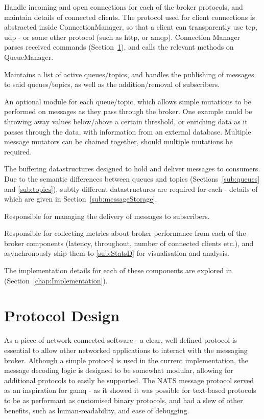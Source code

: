 \begin{description}[style=nextline]
  \item[Connection Manager]
  Handle incoming and open connections for each of the broker protocols, and
  maintain details of connected clients. The protocol used for client
  connections is abstracted inside ConnectionManager, so that a client can
  transparently use \gls{tcp}, \gls{udp} - or some other protocol (such as
  \gls{http}, or \gls{amqp}). Connection Manager parses received commands
  (Section~\ref{sec:protocol}), and calls the relevant methods on QueueManager.
  \item[Queue Manager]
  Maintains a list of active queues/topics, and handles the publishing of
  messages to said queues/topics, as well as the addition/removal of
  subscribers.
  \item[Message Mutators]
  An optional module for each queue/topic, which allows simple mutations to be
  performed on messages as they pass through the broker. One example could be
  throwing away values below/above a certain threshold, or enriching data as it
  passes through the data, with information from an external database. Multiple
  message mutators can be chained together, should multiple mutations be
  required.
  \item[Queue/Topics]
  The buffering datastructures designed to hold and deliver messages to
  consumers. Due to the semantic differences between queues and topics
  (Sections~\ref{sub:queues} and \ref{sub:topics}), subtly different
  datastructures are required for each - details of which are given in
  Section~\ref{sub:messageStorage}.
  \item[Message Shippers]
  Responsible for managing the delivery of messages to subscribers.
  \item[Metric Manager]
  Responsible for collecting metrics about broker performance from each of the
  broker components (latency, throughout, number of connected clients etc.), and
  asynchronously ship them to \ref{sub:StatsD} for visualisation and analysis.
\end{description}

The implementation details for each of these components are explored in
(Section~\ref{chap:Implementation}).

\section{Protocol Design}
\label{sec:protocol}

As a piece of network-connected software - a clear, well-defined protocol is
essential to allow other networked applications to interact with the messaging
broker. Although a simple protocol is used in the current implementation, the
message decoding logic is designed to be somewhat modular, allowing for
additional protocols to easily be supported. The NATS message
protocol\cite{natsProtocol} served as an inspiration for gamq - as it showed it
was possible for text-based protocols to be as performant as customised binary
protocols, and had a slew of other benefits, such as human-readability, and ease
of debugging.

